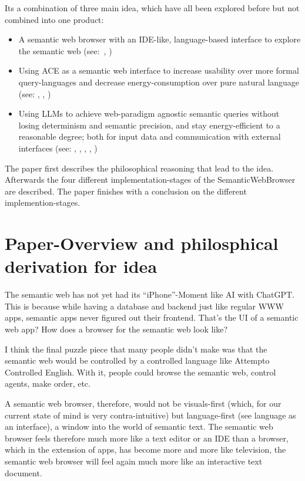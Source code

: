 \documentclass[12pt,a4paper]{article}
\begin{document}
Its a combination of three main idea, which have all been explored before but not combined into one product:

\begin{itemize}
    \item A semantic web browser with an IDE-like, language-based interface to explore the semantic web (see:~\cite{semanticWebBrowser}, \cite{headlessBrowsers})
    \item Using ACE as a semantic web interface to increase usability over more formal query-languages and decrease energy-consumption over pure natural language (see: \cite{semanticWebLanguageBased}, \cite{semanticWebControlledEnglish}, \cite{semanticWebAce})
    \item Using LLMs to achieve web-paradigm agnostic semantic queries without losing determinism and semantic precision, and stay energy-efficient to a reasonable degree; both for input data and communication with external interfaces (see: \cite{llmAsDataTranslator}, \cite{llmForIntegratingHeterogenousData}, \cite{neuroSymbolicAi}, \cite{domainDiscoveryTool}, \cite{schemaInference})
\end{itemize}

The paper first describes the philosophical reasoning that lead to the idea.
Afterwards the four different implementation-stages of the SemanticWebBrowser are described.
The paper finishes with a conclusion on the different implemention-stages.

\section{Paper-Overview and philosphical derivation for idea}

The semantic web has not yet had its ``iPhone''-Moment like AI with ChatGPT. This is because while having a database and backend just like regular WWW apps, semantic apps never figured out their frontend. That's the UI of a semantic web app? How does a browser for the semantic web look like?

I think the final puzzle piece that many people didn't make was that the semantic web would be controlled by a controlled language like Attempto Controlled English. With it, people could browse the semantic web, control agents, make order, etc.

A semantic web browser, therefore, would not be visuals-first (which, for our current state of mind is very contra-intuitive) but language-first (see language as an interface), a window into the world of semantic text. The semantic web browser feels therefore much more like a text editor or an IDE than a browser, which in the extension of apps, has become more and more like television, the semantic web browser will feel again much more like an interactive text document.
\end{document}
